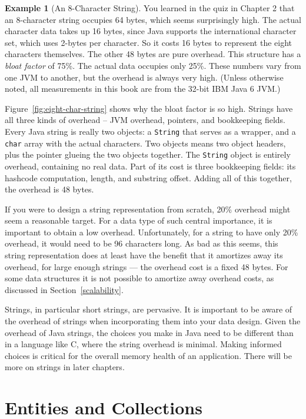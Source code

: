 \documentclass{book}
\theoremstyle{definition}
\newtheorem{example}{Example}
\begin{document}
\begin{example}[An 8-Character String]
 You learned in the quiz in Chapter 2 that an 8-character string occupies 64 bytes, which seems surprisingly high. The actual character data takes up 16 bytes, since Java supports the international character set, which uses 2-bytes per character. So it costs 16 bytes to represent the eight characters themselves. The other 48 bytes are pure overhead. This structure has a \emph{bloat factor} of 75\%. The actual data occupies only 25\%. These numbers vary from one JVM to another, but the overhead is always very high. (Unless otherwise noted, all measurements in this book are from the 32-bit IBM Java 6 JVM.)

Figure~\ref{fig:eight-char-string} shows why the bloat factor is so high. Strings have all three kinds of overhead -- JVM overhead, pointers, and bookkeeping fields. Every Java string is really two objects: a {\tt String} that serves as a wrapper, and a {\tt char} array with the actual characters. Two objects means two object headers, plus the pointer glueing the two objects together. The {\tt String} object is entirely overhead, containing no real data. Part of its cost is three bookkeeping fields: its hashcode computation, length, and substring offset. Adding all of this together, the overhead is 48 bytes.  
\end{example}
If you were to design a string representation from scratch, 20\%
overhead might seem a reasonable target. For a data type of such
central importance, it is important to obtain a low overhead.
Unfortunately, for a string to have only 20\% overhead, it would need
to be 96 characters long. As bad as this seems, this string
representation does at least have the benefit that it amortizes away
its overhead, for large enough strings --- the overhead cost is a
fixed 48 bytes.  For some data structures it is not possible to
amortize away overhead costs, as discussed in
Section~\ref{scalability}.

Strings, in particular short strings, are pervasive. It is important to be aware of the overhead of strings when incorporating them into your data design. Given the overhead of Java strings, the choices you make in Java need to be different than in a language like C, where the string overhead is minimal. Making informed choices is critical for the overall memory health of an application. There will be more on strings in later chapters.

\section{Entities and Collections}
\end{document}
